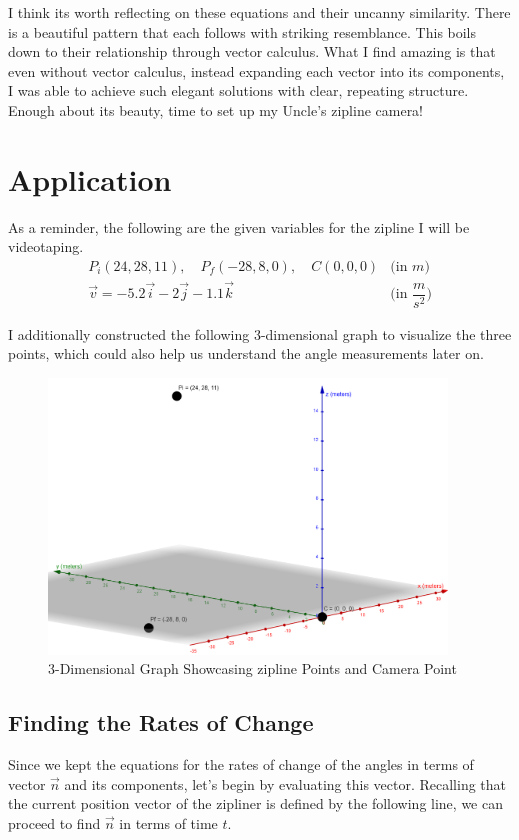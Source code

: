 \documentclass[12pt]{article}
\begin{document}
I think its worth reflecting on these equations and their uncanny similarity. There is a beautiful pattern that each follows with striking resemblance. This boils down to their relationship through vector calculus. What I find amazing is that even without vector calculus, instead expanding each vector into its components, I was able to achieve such elegant solutions with clear, repeating structure. Enough about its beauty, time to set up my Uncle's zipline camera!

\section{Application}

As a reminder, the following are the given variables for the zipline I will be videotaping.
$$
\begin{array}{c|c}
    P_i(24,28,11), \quad P_f(-28,8,0), \quad C(0,0,0) & \text{(in }m\text{)} \\
    \vec v = -5.2\vec i - 2\vec j -1.1 \vec k & \text{(in } \dfrac{m}{s^2} \text{)}  
\end{array}
$$

I additionally constructed the following 3-dimensional graph to visualize the three points, which could also help us understand the angle measurements later on. 
\begin{figure}[H]
\centering
\includegraphics[width=300pt]{img/geogebra1.png}
\caption{\label{fig:2}3-Dimensional Graph Showcasing zipline Points and Camera Point}
\end{figure}


\subsection{Finding the Rates of Change}

Since we kept the equations for the rates of change of the angles in terms of vector $\vec n$ and its components, let's begin by evaluating this vector. Recalling that the current position vector of the zipliner is defined by the following line, we can proceed to find $\vec n$ in terms of time $t$.
\end{document}
